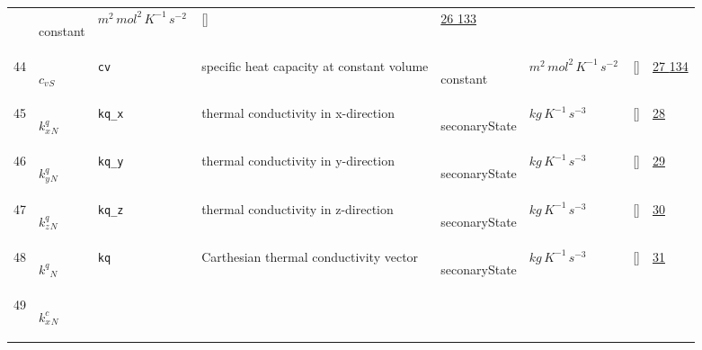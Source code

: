 \begin{longtable}{|p{1cm}|p{3cm}|p{3cm}|p{7cm}|p{3.0cm}|p{3cm}|p{2cm}|p{1cm}|}
             & \begin{lay}constant \end{lay}
             & $ m^{2} \,mol^{2} \,K^{-1} \,s^{-2} \, $
             & []
             & \hyperlink{"e:26"}{ 26 }
                 \hyperlink{"e:133"}{ 133 }
                 \\
    44
             & \hypertarget{"v:44"}{ $ {c_{v}}{_{S}} $}
             & \verb|cv|
             & specific heat capacity at constant volume
             & \begin{lay}constant \end{lay}
             & $ m^{2} \,mol^{2} \,K^{-1} \,s^{-2} \, $
             & []
             & \hyperlink{"e:27"}{ 27 }
                 \hyperlink{"e:134"}{ 134 }
                 \\
    45
             & \hypertarget{"v:45"}{ $ {k^{q}_{x}}{_{N}} $}
             & \verb|kq_x|
             & thermal conductivity in x-direction
             & \begin{lay}seconaryState \end{lay}
             & $ kg \,K^{-1} \,s^{-3} \, $
             & []
             & \hyperlink{"e:28"}{ 28 }
                 \\
    46
             & \hypertarget{"v:46"}{ $ {k^{q}_{y}}{_{N}} $}
             & \verb|kq_y|
             & thermal conductivity in y-direction
             & \begin{lay}seconaryState \end{lay}
             & $ kg \,K^{-1} \,s^{-3} \, $
             & []
             & \hyperlink{"e:29"}{ 29 }
                 \\
    47
             & \hypertarget{"v:47"}{ $ {k^{q}_{z}}{_{N}} $}
             & \verb|kq_z|
             & thermal conductivity in z-direction
             & \begin{lay}seconaryState \end{lay}
             & $ kg \,K^{-1} \,s^{-3} \, $
             & []
             & \hyperlink{"e:30"}{ 30 }
                 \\
    48
             & \hypertarget{"v:48"}{ $ {k^{q}}{_{N}} $}
             & \verb|kq|
             & Carthesian thermal conductivity vector
             & \begin{lay}seconaryState \end{lay}
             & $ kg \,K^{-1} \,s^{-3} \, $
             & []
             & \hyperlink{"e:31"}{ 31 }
                 \\
    49
             & \hypertarget{"v:49"}{ $ {k^{c}_{x}}{_{N}} $}

\end{longtable}
